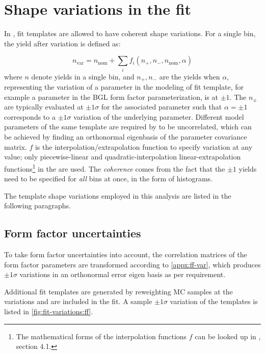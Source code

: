 \section{Shape variations in the fit}
\label{ref:fit:var}

In \HistFactory, fit templates are allowed to have coherent shape variations.
For a single bin, the yield after variation is defined as:

\begin{equation}
    n_\text{var} = n_\text{nom} + \sum_i f_i(n_+, n_-, n_\text{nom}, \alpha)
\end{equation}
where $n$ denote yields in a single bin, and
$n_+, n_-$ are the yields when $\alpha$,
representing the variation of a parameter in the modeling of fit template,
for example a parameter in the BGL form factor parameterization,
is at $\pm 1$.
The $n_\pm$ are typically evaluated at $\pm 1 \sigma$ for the associated
parameter such that $\alpha = \pm 1$ corresponds to a $\pm 1 \sigma$ variation
of the underlying parameter.
Different model parameters of the same template are required by \HistFactory to
be uncorrelated,
which can be achieved by finding an orthonormal eigenbasis of the parameter
covariance matrix.
$f$ is the interpolation/extrapolation function to specify variation
at any value;
only piecewise-linear and quadratic-interpolation linear-extrapolation
functions\footnote{
    The mathematical forms of the interpolation functions $f$ can be looked
    up in \cite{Cranmer:2012sba}, section 4.1.
} in the \HistFactory are used.
The \emph{coherence} comes from the fact that the $\pm 1$ yields need to be
specified for \emph{all} bins at once, in the form of histograms.

The template shape variations employed in this analysis are listed in the
following paragraphs.





\subsection{Form factor uncertainties}

To take form factor uncertainties into account, the correlation
matrices of the form factor parameters are transformed
according to \cref{appx:ff-var}, which produces $\pm 1\sigma$ variations
in an orthonormal error eigen basis as per \HistFactory requirement.

Additional fit templates are generated by reweighting MC samples at the
variations and are included in the fit.
A sample $\pm 1\sigma$ variation of the \Dz\mun templates is listed in
\cref{fig:fit-variations:ff}.


